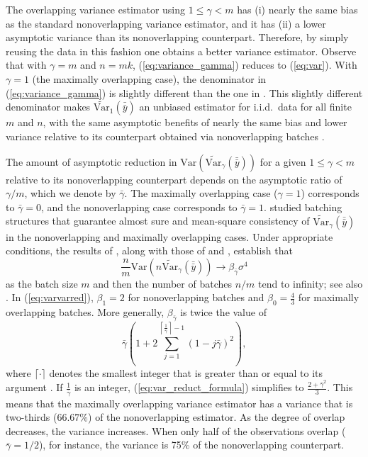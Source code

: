 \documentclass[12pt]{article}
\newcommand{\var}[1]{\mathrm{Var} \left( #1 \right)}
\newcommand{\vartg}[1]{\widetilde{\mathrm{Var}}_\gamma \left( #1 \right)}
\newcommand{\vto}[1]{\widetilde{\mathrm{Var}}_{1} \left( #1 \right)}
\newcommand{\gammab}{\bar{\gamma}}
\newcommand{\ogb}{\tfrac{1}{\gammab}}
\newcommand{\cogb}{\left\lceil\ogb\right\rceil}
\newcommand{\yb}{\bar{y}}
\newcommand{\ybb}{\bar{\yb}}
\begin{document}
The overlapping variance estimator using $1 \leq \gamma < m$ has (i) nearly the same bias as the standard nonoverlapping variance estimator, and it has (ii) a lower asymptotic variance than its nonoverlapping counterpart. 
Therefore, by simply reusing the data in this fashion one obtains a better variance estimator. 
Observe that with $\gamma=m$ and $n=mk$, (\ref{eq:variance_gamma}) reduces to (\ref{eq:var}).
With $\gamma=1$ (the maximally overlapping case), the denominator in (\ref{eq:variance_gamma}) is slightly different than the one in  \cite{Meketon1984}.
This slightly different denominator makes $\vto{\ybb}$ an unbiased estimator for i.i.d.\ data for all finite $m$ and $n$, with the same asymptotic benefits of nearly the same bias and lower variance relative to its counterpart obtained via nonoverlapping batches \citep{Song1992}. 
 

The amount of asymptotic reduction in $\var{\vartg{\ybb}}$ for a given $1\leq \gamma< m$ relative to its nonoverlapping counterpart depends on the asymptotic ratio of $\gamma/m$, which we denote by $\gammab$. 
The maximally overlapping case ($\gamma = 1$) corresponds to $\gammab=0$, and the nonoverlapping case corresponds to $\gammab=1$. 
\cite{damerdji1994strong,damerdji1995mean} studied batching structures that guarantee almost sure and mean-square consistency of $\vartg{\ybb}$ in the nonoverlapping and maximally overlapping cases. 
Under appropriate conditions, the results of \cite{damerdji1995mean}, along with those of \cite{Meketon1984} and \cite{Welch1987}, establish that 
\begin{equation}
\label{eq:varvarred}
\frac{n}{m}\var{n \vartg{\ybb}} \rightarrow \beta_{\gammab} \sigma^4
\end{equation}
as the batch size $m$ and then the number of batches $n/m$ tend to infinity; see also \cite{Alexopoulos2007}. 
In (\ref{eq:varvarred}), $\beta_1 = 2$ for nonoverlapping batches and $\beta_0 = \frac{4}{3}$ for maximally overlapping batches.  
More generally, $\beta_{\gammab}$ is twice the value of 
\begin{equation} \label{eq:var_reduct_formula}
	\gammab \left( 1 + 2 \sum_{j=1}^{\cogb-1} (1-j\gammab)^2 \right),
\end{equation}
where $\lceil \cdot \rceil$ denotes the smallest integer that is greater than or equal to its argument \citep{Welch1987}.
If $\ogb$ is an integer, (\ref{eq:var_reduct_formula}) simplifies to $\frac{2+\gammab^2}{3}$.
This means that the maximally overlapping variance estimator has a variance that is two-thirds ($66.67\%$) of the nonoverlapping estimator.
As the degree of overlap decreases, the variance increases. 
When only half of the observations overlap 
($\gammab = 1/2$), for instance, the variance is 75\% of the nonoverlapping counterpart.
\end{document}
